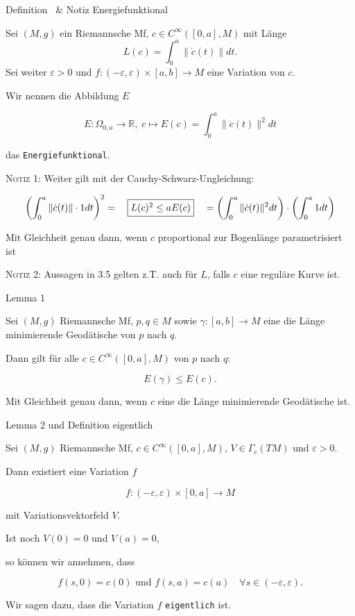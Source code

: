 \documentclass[a6paper,11pt,grid=front]{kartei}
\newcommand{\fl}[1]{\begin{flushleft}
 #1 \end{flushleft}}
\newcommand{\R}{\mathbb{R}}
\newcommand{\eps}{\varepsilon}
\newcounter{def}
\newcommand{\thisdef}{\thedef\ \stepcounter{def}}
\begin{document}
\nonameyet
{\small Definition \thisdef \& Notiz} {\small Energiefunktional}
{
\footnotesize
\vspace{-2em}
Sei $(M,g)$ ein Riemannsche Mf, $c \in C^\infty([0,a],M)$ mit 
Länge 
\[
L(c) = \int_0^a \| \dot c(t) \| dt.
\]
Sei weiter $\eps > 0$ und $f : (-\eps,\eps) \times [a,b] \to M$ eine 
Variation von $c$.
\fl{Wir nennen die Abbildung $E$}
\[
E : \Omega_{0,a} \to \R, \; c \mapsto E(c) = \int_0^a \|\dot c(t)\|^2 dt 
\]
\fl{das \texttt{Energiefunktional}.}

\fl{\textsc{Notiz 1:} Weiter gilt mit der Cauchy-Schwarz-Ungleichung:}
\[
\left(\int_0^a \|\dot c(t) \| \cdot 1 dt \right) ^2
= \quad  
\fbox{$L(c)^2 \leq aE(c) $}
\quad = 
\left(\int_0^a \|\dot c(t) \|^2 dt \right) \cdot \left(\int_0^a 1 dt \right) 
\]
\fl{Mit Gleichheit genau dann, wenn $c$ proportional zur Bogenlänge 
parametrisiert ist}

\fl{\textsc{Notiz 2:} Aussagen in 3.5 gelten z.T. auch für $L$, falls 
$c$ eine reguläre Kurve ist.} 
}
{}

\nonameyet
{Lemma 1} {}
{
\small
Sei $(M,g)$ Riemannsche Mf, $p,q \in M$ sowie $\gamma :[a,b] \to M$ eine die 
Länge minimierende Geodätische von $p$ nach $q$.
\fl{Dann gilt für alle $c\in C^\infty([0,a],M)$ von $p$ nach $q$:}
\[
E(\gamma) \leq E(c).
\]
\fl{Mit Gleichheit genau dann, wenn $c$ eine die Länge minimierende Geodätische 
ist.}
}
{}

\nonameyet
{Lemma 2 und Definition} {eigentlich}
{
Sei $(M,g)$ Riemannsche Mf, $c \in C^\infty([0,a],M)$, $V \in \Gamma_c(TM)$
und $\eps > 0$.
\fl{Dann existiert eine Variation $f$}
\[
f : (-\eps,\eps) \times [0,a] \to M
\]
\fl{mit Variationsvektorfeld $V$.}
Ist noch $V(0) = 0$ und $V(a) = 0$, 
\\
\fl{so können wir annehmen, dass }
\[
f(s,0) = c(0) \text{ und } f(s,a) = c(a) \quad \forall s \in (-\eps,\eps).
\]
\fl{Wir sagen dazu, dass die Variation $f$ \texttt{eigentlich} ist.}
}
{}
\end{document}
